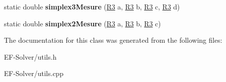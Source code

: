 \begin{DoxyCompactItemize}
\item 
static double {\bfseries simplex3\+Mesure} (\hyperlink{class_r3}{R3} a, \hyperlink{class_r3}{R3} b, \hyperlink{class_r3}{R3} c, \hyperlink{class_r3}{R3} d)\hypertarget{classutil_a90f1098f73b1cef478c89d222f71a698}{}\label{classutil_a90f1098f73b1cef478c89d222f71a698}

\item 
static double {\bfseries simplex2\+Mesure} (\hyperlink{class_r3}{R3} a, \hyperlink{class_r3}{R3} b, \hyperlink{class_r3}{R3} c)\hypertarget{classutil_ae9613b3e4e2c8ad51148167c362804be}{}\label{classutil_ae9613b3e4e2c8ad51148167c362804be}

\end{DoxyCompactItemize}


The documentation for this class was generated from the following files\+:\begin{DoxyCompactItemize}
\item 
E\+F-\/\+Solver/utils.\+h\item 
E\+F-\/\+Solver/utils.\+cpp\end{DoxyCompactItemize}
